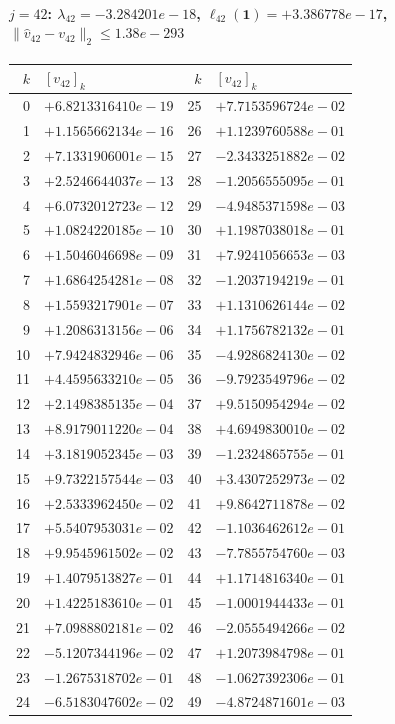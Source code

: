 \paragraph{$j = 42$: $\lambda_{42} = -3.284201e-18$, \quad $\ell_{42}(\mathbf{1}) = +3.386778e-17$, \quad $\|\hat{v}_{42} - v_{42}\|_2 \leq 1.38e-293$}
\begin{center}
{\footnotesize
\begin{tabular}{r@{\;\;}l@{\quad}r@{\;\;}l}
\toprule
$k$ & $[v_{42}]_k$ & $k$ & $[v_{42}]_k$ \\
\midrule
0 & $+6.8213316410e-19$ & 25 & $+7.7153596724e-02$ \\
1 & $+1.1565662134e-16$ & 26 & $+1.1239760588e-01$ \\
2 & $+7.1331906001e-15$ & 27 & $-2.3433251882e-02$ \\
3 & $+2.5246644037e-13$ & 28 & $-1.2056555095e-01$ \\
4 & $+6.0732012723e-12$ & 29 & $-4.9485371598e-03$ \\
5 & $+1.0824220185e-10$ & 30 & $+1.1987038018e-01$ \\
6 & $+1.5046046698e-09$ & 31 & $+7.9241056653e-03$ \\
7 & $+1.6864254281e-08$ & 32 & $-1.2037194219e-01$ \\
8 & $+1.5593217901e-07$ & 33 & $+1.1310626144e-02$ \\
9 & $+1.2086313156e-06$ & 34 & $+1.1756782132e-01$ \\
10 & $+7.9424832946e-06$ & 35 & $-4.9286824130e-02$ \\
11 & $+4.4595633210e-05$ & 36 & $-9.7923549796e-02$ \\
12 & $+2.1498385135e-04$ & 37 & $+9.5150954294e-02$ \\
13 & $+8.9179011220e-04$ & 38 & $+4.6949830010e-02$ \\
14 & $+3.1819052345e-03$ & 39 & $-1.2324865755e-01$ \\
15 & $+9.7322157544e-03$ & 40 & $+3.4307252973e-02$ \\
16 & $+2.5333962450e-02$ & 41 & $+9.8642711878e-02$ \\
17 & $+5.5407953031e-02$ & 42 & $-1.1036462612e-01$ \\
18 & $+9.9545961502e-02$ & 43 & $-7.7855754760e-03$ \\
19 & $+1.4079513827e-01$ & 44 & $+1.1714816340e-01$ \\
20 & $+1.4225183610e-01$ & 45 & $-1.0001944433e-01$ \\
21 & $+7.0988802181e-02$ & 46 & $-2.0555494266e-02$ \\
22 & $-5.1207344196e-02$ & 47 & $+1.2073984798e-01$ \\
23 & $-1.2675318702e-01$ & 48 & $-1.0627392306e-01$ \\
24 & $-6.5183047602e-02$ & 49 & $-4.8724871601e-03$ \\
\bottomrule
\end{tabular}
}
\end{center}

